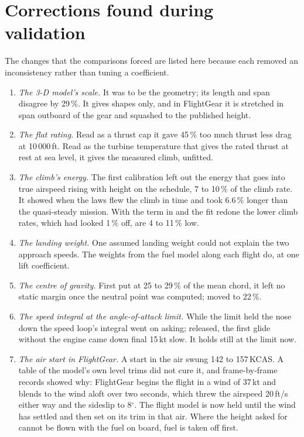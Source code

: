\documentclass[10pt,a4paper,twocolumn]{article}
\begin{document}
\section{Corrections found during validation}\label{sec:review}
The changes that the comparisons forced are listed here because each removed an inconsistency rather than tuning a coefficient.
\begin{enumerate}
\item \emph{The 3-D model's scale.} It was to be the geometry; its length and span disagree by 29\,\%. It gives shapes only, and in FlightGear it is
stretched in span outboard of the gear and squashed to the published height.
\item \emph{The flat rating.} Read as a thrust cap it gave 45\,\% too much thrust less drag at 10\,000\,ft. Read as the turbine temperature that
gives the rated thrust at rest at sea level, it gives the measured climb, unfitted.
\item \emph{The climb's energy.} The first calibration left out the energy that goes into true airspeed rising with height on the schedule, 7 to 10\,\%
of the climb rate. It showed when the laws flew the climb in time and took 6.6\,\% longer than the quasi-steady mission. With the term in and the fit
redone the lower climb rates, which had looked 1\,\% off, are 4 to 11\,\% low.
\item \emph{The landing weight.} One assumed landing weight could not explain the two approach speeds. The weights from the fuel model along each
flight do, at one lift coefficient.
\item \emph{The centre of gravity.} First put at 25 to 29\,\% of the mean chord, it left no static margin once the neutral point was computed; moved to 22\,\%.
\item \emph{The speed integral at the angle-of-attack limit.} While the limit held the nose down the speed loop's integral went on asking; released, the
first glide without the engine came down final 15\,kt slow. It holds still at the limit now.
\item \emph{The air start in FlightGear.}\label{it:wind} A start in the air swung 142 to 157\,KCAS. A table of the model's own level trims did not cure
it, and frame-by-frame records showed why: FlightGear begins the flight in a wind of 37\,kt and blends to the wind aloft over two seconds, which threw
the airspeed 20\,ft/s either way and the sideslip to 8$^\circ$. The flight model is now held until the wind has settled and then set on its trim in
that air. Where the height asked for cannot be flown with the fuel on board, fuel is taken off first.

\end{enumerate}
\end{document}
